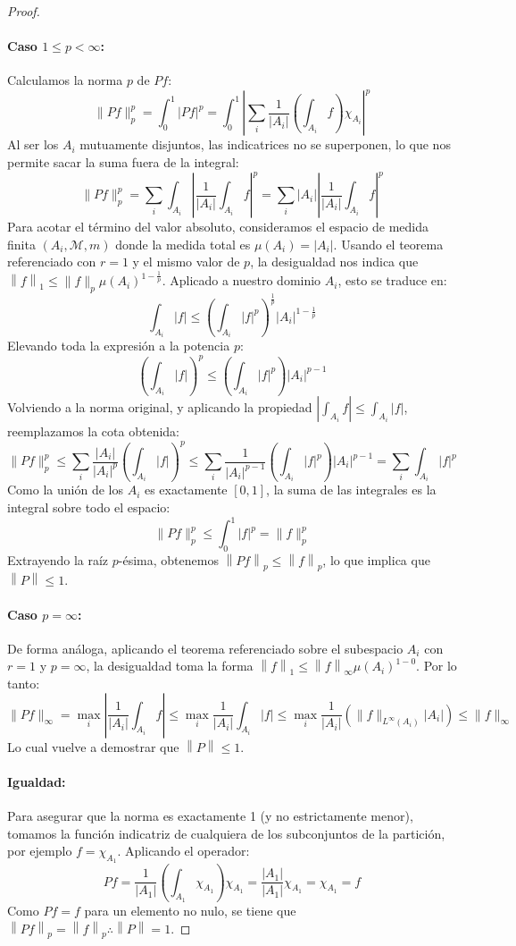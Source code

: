 \documentclass{article}
\theoremstyle{definition}
\newcommand{\norm}[1]{\left\lVert #1 \right\rVert}       %
\begin{document}
\begin{proof}
	\paragraph{Caso \(1 \le p < \infty \):}
	Calculamos la norma \(p\) de \(Pf\):
	\[
		\|Pf\|_p^p = \int_0^1 |Pf|^p = \int_0^1 \left| \sum_{i} \frac{1}{|A_i|} \left( \int_{A_i} f \right) \chi_{A_i} \right|^p
	\]
	Al ser los \(A_i\) mutuamente disjuntos, las indicatrices no se superponen, lo que nos permite sacar la suma fuera de la integral:
	\[
		\|Pf\|_p^p = \sum_{i} \int_{A_i} \left| \frac{1}{|A_i|} \int_{A_i} f \right|^p = \sum_{i} |A_i| \left| \frac{1}{|A_i|} \int_{A_i} f \right|^p
	\]
	Para acotar el término del valor absoluto, consideramos el espacio de medida finita \((A_i, \mathcal{M}, m)\) donde la medida total es \(\mu(A_i) = |A_i|\). Usando el teorema referenciado con \(r=1\) y el mismo valor de \(p\), la desigualdad nos indica que \( \norm{f}_1 \le \|f\|_p {\mu(A_i)}^{1 - \frac{1}{p}}\). Aplicado a nuestro dominio \(A_i\), esto se traduce en:
	\[
		\int_{A_i} |f| \le {\left( \int_{A_i} |f|^p \right)}^{\frac{1}{p}} |A_i|^{1 - \frac{1}{p}}
	\]
	Elevando toda la expresión a la potencia \(p\):
	\[
		{\left( \int_{A_i} |f| \right)}^p \le \left( \int_{A_i} |f|^p \right) |A_i|^{p - 1}
	\]
	Volviendo a la norma original, y aplicando la propiedad \(\left| \int_{A_i} f \right| \le \int_{A_i} |f|\), reemplazamos la cota obtenida:
	\[
		\|Pf\|_p^p \le \sum_{i} \frac{|A_i|}{|A_i|^p} {\left( \int_{A_i} |f| \right)}^p \le \sum_{i} \frac{1}{|A_i|^{p-1}} \left( \int_{A_i} |f|^p \right) |A_i|^{p - 1} = \sum_{i} \int_{A_i} |f|^p
	\]
	Como la unión de los \(A_i\) es exactamente \([0,1]\), la suma de las integrales es la integral sobre todo el espacio:
	\[
		\|Pf\|_p^p \le \int_0^1 |f|^p = \|f\|_p^p
	\]
	Extrayendo la raíz \(p\)-ésima, obtenemos \(\norm{Pf}_p \le \norm{f}_p\), lo que implica que \(\norm{P} \le 1\).

	\paragraph{Caso \( p = \infty \):}
	De forma análoga, aplicando el teorema referenciado sobre el subespacio \(A_i\) con \(r=1\) y \( p=\infty \), la desigualdad toma la forma \( \norm{f}_1 \le \norm{f}_\infty {\mu(A_i)}^{1 - 0}\). Por lo tanto:
	\[
		\|Pf\|_\infty = \max_{i} \left| \frac{1}{|A_i|} \int_{A_i} f \right| \le \max_{i} \frac{1}{|A_i|} \int_{A_i} |f| \le \max_{i} \frac{1}{|A_i|} \left( \|f\|_{L^\infty(A_i)} |A_i| \right) \le \|f\|_\infty
	\]
	Lo cual vuelve a demostrar que \( \norm{P} \le 1\).

	\paragraph{Igualdad:}
	Para asegurar que la norma es exactamente 1 (y no estrictamente menor), tomamos la función indicatriz de cualquiera de los subconjuntos de la partición, por ejemplo \(f = \chi_{A_1}\). Aplicando el operador:
	\[
		Pf = \frac{1}{|A_1|} \left( \int_{A_1} \chi_{A_1} \right) \chi_{A_1} = \frac{|A_1|}{|A_1|} \chi_{A_1} = \chi_{A_1} = f
	\]
	Como \(Pf = f\) para un elemento no nulo, se tiene que \(\norm{Pf}_p = \norm{f}_p \therefore \norm{P} = 1\).
\end{proof}
\end{document}
